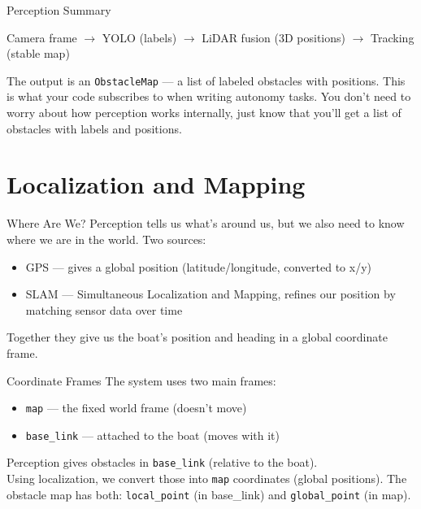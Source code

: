 \documentclass[aspectratio=169]{beamer}
\begin{document}
\begin{frame}{Perception Summary}
    \begin{center}
        Camera frame $\rightarrow$ YOLO (labels) $\rightarrow$ LiDAR fusion (3D positions) $\rightarrow$ Tracking (stable map)
    \end{center}
    \vfill
    The output is an \texttt{ObstacleMap} --- a list of labeled obstacles with positions.
    \vfill
    This is what your code subscribes to when writing autonomy tasks. You don't need to worry about how perception works internally, just know that you'll get a list of obstacles with labels and positions.
\end{frame}

\section{Localization and Mapping}

\begin{frame}{Where Are We?}
    Perception tells us what's around us, but we also need to know where we are in the world.
    \vfill
    Two sources:
    \begin{itemize}
        \item GPS --- gives a global position (latitude/longitude, converted to x/y)
        \item SLAM --- Simultaneous Localization and Mapping, refines our position by matching sensor data over time
    \end{itemize}
    \vfill
    Together they give us the boat's position and heading in a global coordinate frame.
\end{frame}

\begin{frame}{Coordinate Frames}
    The system uses two main frames:
    \vfill
    \begin{itemize}
        \item \texttt{map} --- the fixed world frame (doesn't move)
        \item \texttt{base\_link} --- attached to the boat (moves with it)
    \end{itemize}
    \vfill
    Perception gives obstacles in \texttt{base\_link} (relative to the boat). \\
    Using localization, we convert those into \texttt{map} coordinates (global positions).
    \vfill
    The obstacle map has both: \texttt{local\_point} (in base\_link) and \texttt{global\_point} (in map).
\end{frame}
\end{document}
